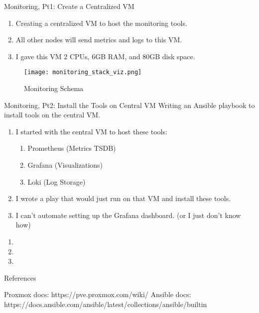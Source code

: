 \documentclass[14pt,compress,usenames,dvipsnames,aspectratio=169]{beamer}
\begin{document}
\begin{frame}{Monitoring, Pt1: Create a Centralized VM}
    \begin{enumerate}
        \item{Creating a centralized VM to host the monitoring tools.} 
        \item{All other nodes will send metrics and logs to this VM.}
        \item{I gave this VM 2 CPUs, 6GB RAM, and 80GB disk space.}
    \end{enumerate}
    \begin{figure}
        \centering
        \texttt{[image: monitoring\_stack\_viz.png]}
        \caption{Monitoring Schema}
        \label{fig:enter-label}
    \end{figure} 
\end{frame}


\begin{frame}{Monitoring, Pt2: Install the Tools on Central VM}
    Writing an Ansible playbook to install tools on the central VM.
    \begin{enumerate}
        \item{I started with the central VM to host these tools:} 
            \begin{enumerate}
                \item{Prometheus (Metrics TSDB)}
                \item{Grafana (Visualizations)}
                \item{Loki (Log Storage)}
            \end{enumerate}
        \item{I wrote a play that would just run on that VM and install these tools.}
        \item{I can't automate setting up the Grafana dashboard. (or I just don't
            know how)}
    \end{enumerate}
\end{frame}



\begin{frame}{}
    \begin{enumerate}
        \item{} 
        \item{}
        \item{}
    \end{enumerate}
\end{frame}

\begin{frame}{References}
    
        Proxmox docs: https://pve.proxmox.com/wiki/
        Ansible docs: https://docs.ansible.com/ansible/latest/collections/ansible/builtin
    
\end{frame}
\end{document}
